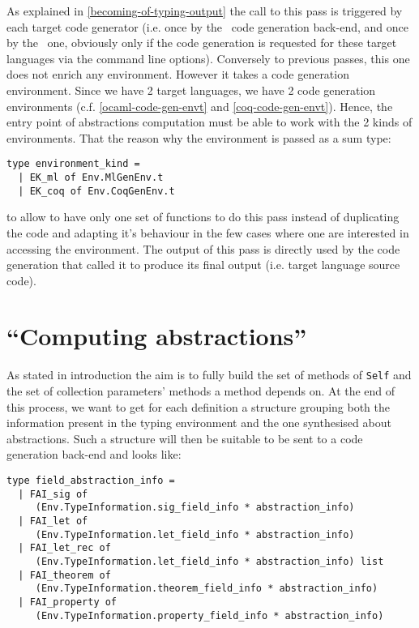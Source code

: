 As explained in \ref{becoming-of-typing-output} the call to this pass
is triggered by each target code generator (i.e. once by the
\ocaml\ code generation back-end, and once by the \coq\ one, obviously
only if the code generation is requested for these target languages
via the command line options). Conversely to previous passes, this one
does not enrich any environment. However it takes a code generation
environment. Since we have 2 target languages, we have 2 code
generation environments (c.f. \ref{ocaml-code-gen-envt} and
\ref{coq-code-gen-envt}). Hence, the entry point of abstractions
computation must be able to work with the 2 kinds of
environments. That the reason why the environment is passed as a sum
type:

{\footnotesize
\begin{lstlisting}[language=MyOCaml]
type environment_kind =
  | EK_ml of Env.MlGenEnv.t
  | EK_coq of Env.CoqGenEnv.t
\end{lstlisting}}

\noindent to allow to have only one set of functions to do this pass
instead of duplicating the code and adapting it's behaviour in the few
cases where one are interested in accessing the environment. The
output of this pass is directly used by the code generation that
called it to produce its final output (i.e. target language source
code).



\section{``Computing abstractions''}
As stated in introduction the aim is to fully build the set of
methods of {\tt Self} and the set of collection parameters' methods a
method depends on. At the end of this process, we want to get for each
definition a structure grouping both the information present in the
typing environment and the one synthesised about abstractions. Such a
structure will then be suitable to be sent to a code generation
back-end and looks like:

{\footnotesize
\begin{lstlisting}[language=MyOCaml]
type field_abstraction_info =
  | FAI_sig of
     (Env.TypeInformation.sig_field_info * abstraction_info)
  | FAI_let of
     (Env.TypeInformation.let_field_info * abstraction_info)
  | FAI_let_rec of
     (Env.TypeInformation.let_field_info * abstraction_info) list
  | FAI_theorem of
     (Env.TypeInformation.theorem_field_info * abstraction_info)
  | FAI_property of
     (Env.TypeInformation.property_field_info * abstraction_info)
\end{lstlisting}}

